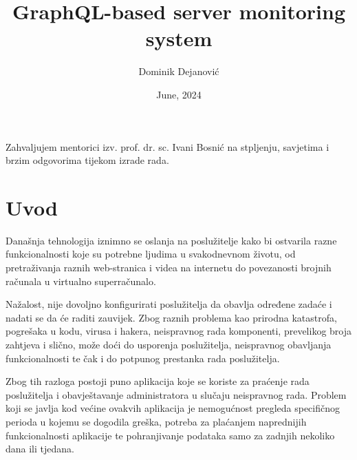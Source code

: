 \documentclass[zavrsnirad]{fer}
\title{GraphQL-based server monitoring system}
\author{Dominik Dejanović}
\date{June, 2024}
\begin{document}
\maketitle






\begin{zahvale}
Zahvaljujem mentorici izv. prof. dr. sc. Ivani Bosnić na stpljenju, savjetima i brzim odgovorima tijekom izrade rada.
\end{zahvale}


\mainmatter


\tableofcontents


\chapter{Uvod}
\label{pog:uvod}
Današnja tehnologija iznimno se oslanja na poslužitelje kako bi ostvarila razne funkcionalnosti koje su potrebne ljudima u svakodnevnom životu, od pretraživanja raznih web-stranica i videa na internetu do povezanosti brojnih računala u virtualno superračunalo. 

Nažalost, nije dovoljno konfigurirati poslužitelja da obavlja određene zadaće i nadati se da će raditi zauvijek. Zbog raznih problema kao prirodna katastrofa, pogrešaka u kodu, virusa i hakera, neispravnog rada komponenti, prevelikog broja zahtjeva i slično, može doći do usporenja poslužitelja, neispravnog obavljanja funkcionalnosti te čak i do potpunog prestanka rada poslužitelja.

Zbog tih razloga postoji puno aplikacija koje se koriste za praćenje rada poslužitelja i obavještavanje administratora u slučaju neispravnog rada. Problem koji se javlja kod većine ovakvih aplikacija je nemogućnost pregleda specifičnog perioda u kojemu se dogodila greška, potreba za plaćanjem naprednijih funkcionalnosti aplikacije te pohranjivanje podataka samo za zadnjih nekoliko dana ili tjedana.
\end{document}
